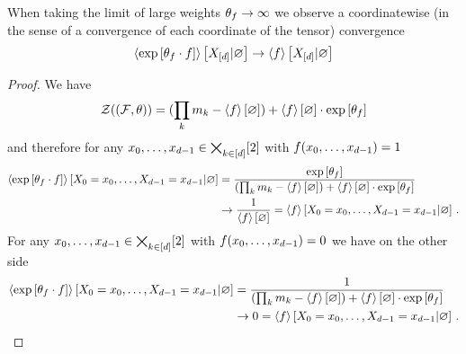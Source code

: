 \begin{lemma}
	When taking the limit of large weights $\theta_{f}\rightarrow\infty$ we observe a coordinatewise (in the sense of a convergence of each coordinate of the tensor) convergence 
	\begin{align}
		\left\langle \mathrm{exp}\left[\theta_{f}\cdot f\right]\right\rangle \left[ X_{[d]} | \varnothing \right] \rightarrow  \left\langle f\right\rangle \left[ X_{[d]} | \varnothing \right]
	\end{align}
\end{lemma}
\begin{proof}
	We have 
	\begin{align*}
		\mathcal{Z}{\left((\mathcal{F},\theta)\right)} = (\prod_{k} m_{k} - \left\langle f\right\rangle \left[ \varnothing \right]) + \left\langle f\right\rangle \left[ \varnothing \right] \cdot \mathrm{exp}\left[\theta_{f}\right]
	\end{align*}
	and therefore for any ${x_{0},\ldots,x_{d-1}}\in\bigtimes_{k\in[d]}[2]$ with $f({x_{0},\ldots,x_{d-1}})=1$
	\begin{align*}
		\left\langle \mathrm{exp}\left[\theta_{f}\cdot f\right]\right\rangle \left[ X_{0}=x_{0},\ldots,X_{d-1}=x_{d-1} | \varnothing \right] 
		&= \frac{
			\mathrm{exp}\left[\theta_{f}\right]
			}{
			(\prod_{k} m_{k} - \left\langle f\right\rangle \left[ \varnothing \right]) + \left\langle f\right\rangle \left[ \varnothing \right] \cdot \mathrm{exp}\left[\theta_{f}\right]
			} \\
		& \rightarrow \frac{1}{\left\langle f\right\rangle \left[ \varnothing \right]} 
		= \left\langle f\right\rangle \left[ X_{0}=x_{0},\ldots,X_{d-1}=x_{d-1} | \varnothing \right] \, . 
	\end{align*}
	For any ${x_{0},\ldots,x_{d-1}}\in\bigtimes_{k\in[d]}[2]$ with $f({x_{0},\ldots,x_{d-1}})=0$ we have on the other side
	\begin{align*}
		\left\langle \mathrm{exp}\left[\theta_{f}\cdot f\right]\right\rangle \left[ X_{0}=x_{0},\ldots,X_{d-1}=x_{d-1} | \varnothing \right] 
		&= \frac{
			1
			}{
			(\prod_{k} m_{k} - \left\langle f\right\rangle \left[ \varnothing \right]) + \left\langle f\right\rangle \left[ \varnothing \right] \cdot \mathrm{exp}\left[\theta_{f}\right]
			} \\
		& \rightarrow 0
		= \left\langle f\right\rangle \left[ X_{0}=x_{0},\ldots,X_{d-1}=x_{d-1} | \varnothing \right] \, . 
	\end{align*}
\end{proof}

